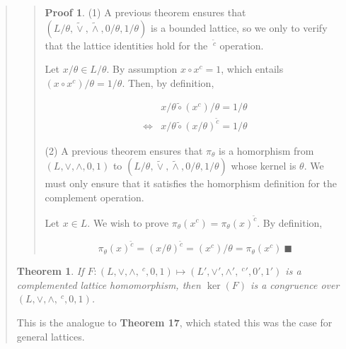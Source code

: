 \documentclass[a4paper, 12pt]{article}
\newtheorem{theorem}{Theorem}
\theoremstyle{definition}
\theoremstyle{definition}
\theoremstyle{definition}
\newtheorem{pro}{Proof}
\DeclareMathOperator{\ker}{ker}
\begin{document}
\begin{quote}
\small
\begin{quote}

\begin{pro}
    (1) A previous theorem ensures that $(L / \theta, \widetilde{\lor},
    \widetilde{ \land}, 0 / \theta, 1/ \theta)$ is a bounded lattice, so we
    only to verify that the lattice identities hold for the $~^\widetilde{ c }
    $ operation.

    Let $x / \theta \in L / \theta$. By assumption $x \circ x^c = 1$, which entails 
    $(x \circ x^c) / \theta = 1/ \theta$. Then, by definition, 

    \begin{align*}
        &x / \theta \widetilde{ \circ  } (x^c) / \theta = 1/\theta \\ 
        \iff & x / \theta \widetilde{ \circ  } (x / \theta)^{\widetilde{ c } } = 1 / \theta
    \end{align*}

    (2) A previous theorem ensures that $\pi_{\theta}$ is a homorphism from 
    $(L, \lor, \land, 0, 1)$ to $(L / \theta, \widetilde{\lor}, \widetilde{
    \land}, 0 / \theta, 1/ \theta)$ whose kernel is $\theta$. We must only
    ensure that it satisfies the homorphism definition for the complement
    operation. 

    Let $x \in L$. We wish to prove $\pi_\theta(x^c) =
    \pi_\theta(x)^{\widetilde{ c }} $. By definition, 

    \begin{equation*}
        \pi_\theta(x)^{\widetilde{ c } } = \left( x / \theta \right)^{\widetilde{ c } } = (x^c) / \theta = \pi_\theta(x^c) ~ \blacksquare
    \end{equation*}



\end{pro}

\end{quote}
\normalsize

\begin{theorem}
    If $F : (L, \lor, \land, ~^c, 0, 1) \mapsto (L', \lor', \land', ~^c', 0',
    1')$ is a complemented lattice homomorphism, then $\ker(F)$
    is a congruence over $(L, \lor, \land, ~^c, 0, 1)$.
\end{theorem}

This is the analogue to \textbf{Theorem 17}, which stated this was the case for
general lattices.

\small
\begin{quote}


\end{quote}
\end{quote}
\end{document}
